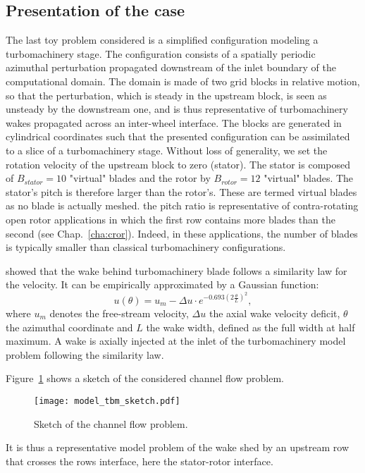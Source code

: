 
\subsection{Presentation of the case}

The last toy problem considered is a simplified 
configuration modeling a turbomachinery 
stage. The configuration consists of a spatially 
periodic azimuthal perturbation propagated downstream 
of the inlet boundary of the computational domain. 
The domain is made of two grid blocks in relative 
motion, so that the perturbation, which is steady 
in the upstream block, is seen as unsteady by the 
downstream one, and is thus representative of 
turbomachinery wakes propagated across an inter-wheel interface.
The blocks are generated in cylindrical
coordinates such that the presented configuration
can be assimilated to a slice of 
a turbomachinery stage.
Without loss of generality, 
we set the rotation velocity of the upstream block to zero (stator). 
The stator is composed of $B_{stator} = 10$
"virtual" blades and the rotor by $B_{rotor} = 12$ "virtual" blades.
The stator's pitch is therefore larger than the rotor's.
These are termed virtual blades as no blade is actually meshed.
the pitch ratio is representative of 
contra-rotating open rotor applications in which 
the first row contains more blades 
than the second (see Chap.~\ref{cha:cror}). Indeed, in
these applications, the number
of blades is typically smaller than classical
turbomachinery configurations.

\citet{Lakshminarayana1980} showed that the wake
behind turbomachinery blade follows a similarity law for the velocity. 
It can be empirically approximated by a Gaussian function:
\begin{equation}
    u (\theta) = u_m - 
        \Delta u \cdot e^{
          -0.693 \left( 2 \frac{\theta}{L} \right) ^ 2},
    \label{eq:similarity}
\end{equation}
where $u_m$ denotes the free-stream velocity, $\Delta u$ the axial wake velocity deficit,
$\theta$ the azimuthal coordinate and $L$ the wake width,
defined as the full width at half maximum.
A wake is axially injected at the inlet of the
turbomachinery model problem following the \citet{Lakshminarayana1980}
similarity law.

Figure~\ref{fig:model_tbm_sketch} shows a sketch
of the considered channel flow problem.
\begin{figure}[htb]
  \centering
  \texttt{[image: model\_tbm\_sketch.pdf]}
  \caption{Sketch of the channel flow problem.}
  \label{fig:model_tbm_sketch}
\end{figure}
It is thus a representative model problem of the wake shed
by an upstream row that crosses the rows interface, 
here the stator-rotor interface.

